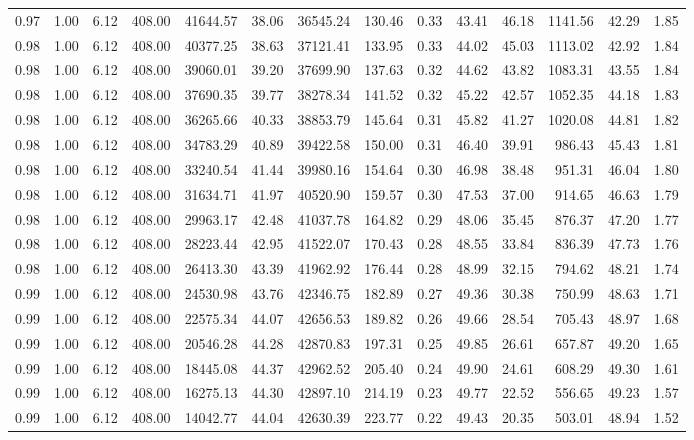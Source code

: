 \begin{table}[!ht]
\begin{tabular}{rrrrrrrrrrrrrr}
0.97 & 1.00 & 6.12 & 408.00 & 41644.57 & 38.06 & 36545.24 & 130.46 & 0.33 & 43.41 & 46.18 & 1141.56 & 42.29 & 1.85 \\
0.98 & 1.00 & 6.12 & 408.00 & 40377.25 & 38.63 & 37121.41 & 133.95 & 0.33 & 44.02 & 45.03 & 1113.02 & 42.92 & 1.84 \\
0.98 & 1.00 & 6.12 & 408.00 & 39060.01 & 39.20 & 37699.90 & 137.63 & 0.32 & 44.62 & 43.82 & 1083.31 & 43.55 & 1.84 \\
0.98 & 1.00 & 6.12 & 408.00 & 37690.35 & 39.77 & 38278.34 & 141.52 & 0.32 & 45.22 & 42.57 & 1052.35 & 44.18 & 1.83 \\
0.98 & 1.00 & 6.12 & 408.00 & 36265.66 & 40.33 & 38853.79 & 145.64 & 0.31 & 45.82 & 41.27 & 1020.08 & 44.81 & 1.82 \\
0.98 & 1.00 & 6.12 & 408.00 & 34783.29 & 40.89 & 39422.58 & 150.00 & 0.31 & 46.40 & 39.91 & 986.43 & 45.43 & 1.81 \\
0.98 & 1.00 & 6.12 & 408.00 & 33240.54 & 41.44 & 39980.16 & 154.64 & 0.30 & 46.98 & 38.48 & 951.31 & 46.04 & 1.80 \\
0.98 & 1.00 & 6.12 & 408.00 & 31634.71 & 41.97 & 40520.90 & 159.57 & 0.30 & 47.53 & 37.00 & 914.65 & 46.63 & 1.79 \\
0.98 & 1.00 & 6.12 & 408.00 & 29963.17 & 42.48 & 41037.78 & 164.82 & 0.29 & 48.06 & 35.45 & 876.37 & 47.20 & 1.77 \\
0.98 & 1.00 & 6.12 & 408.00 & 28223.44 & 42.95 & 41522.07 & 170.43 & 0.28 & 48.55 & 33.84 & 836.39 & 47.73 & 1.76 \\
0.98 & 1.00 & 6.12 & 408.00 & 26413.30 & 43.39 & 41962.92 & 176.44 & 0.28 & 48.99 & 32.15 & 794.62 & 48.21 & 1.74 \\
0.99 & 1.00 & 6.12 & 408.00 & 24530.98 & 43.76 & 42346.75 & 182.89 & 0.27 & 49.36 & 30.38 & 750.99 & 48.63 & 1.71 \\
0.99 & 1.00 & 6.12 & 408.00 & 22575.34 & 44.07 & 42656.53 & 189.82 & 0.26 & 49.66 & 28.54 & 705.43 & 48.97 & 1.68 \\
0.99 & 1.00 & 6.12 & 408.00 & 20546.28 & 44.28 & 42870.83 & 197.31 & 0.25 & 49.85 & 26.61 & 657.87 & 49.20 & 1.65 \\
0.99 & 1.00 & 6.12 & 408.00 & 18445.08 & 44.37 & 42962.52 & 205.40 & 0.24 & 49.90 & 24.61 & 608.29 & 49.30 & 1.61 \\
0.99 & 1.00 & 6.12 & 408.00 & 16275.13 & 44.30 & 42897.10 & 214.19 & 0.23 & 49.77 & 22.52 & 556.65 & 49.23 & 1.57 \\
0.99 & 1.00 & 6.12 & 408.00 & 14042.77 & 44.04 & 42630.39 & 223.77 & 0.22 & 49.43 & 20.35 & 503.01 & 48.94 & 1.52 \\
\bottomrule
\end{tabular}

\end{table}
